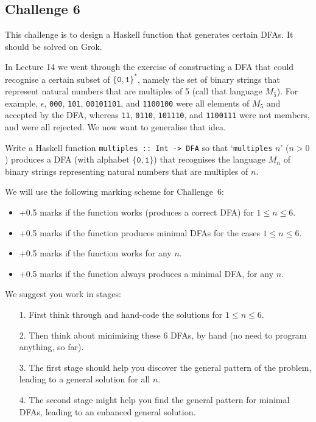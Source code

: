 \documentclass[12pt]{article}
\begin{document}
\subsection*{Challenge 6}

This challenge is to design a Haskell function that generates 
certain DFAs.
It should be solved on Grok.

In Lecture 14 we went through the exercise of constructing a DFA
that could recognise a certain subset of $\{\texttt{0},\texttt{1}\}^*$, 
namely the set of binary strings that represent natural numbers that 
are multiples of 5 (call that language $M_5$).
For example, $\epsilon$, \verb!000!, \verb!101!, \verb!00101101!, 
and \verb!1100100! were all elements of $M_5$ and accepted by the DFA, 
whereas \verb!11!, \verb!0110!, \verb!101110!, and \verb!1100111! 
were not members, and were all rejected.
We now want to generalise that idea.

Write a Haskell function \verb!multiples :: Int -> DFA! so that
`\verb!multiples! $n$' ($n>0$) produces a DFA 
(with alphabet $\{\texttt{0},\texttt{1}\}$) 
that recognises the language $M_n$ of binary strings 
representing natural numbers that are multiples of $n$.

We will use the following marking scheme for Challenge~6:
\begin{itemize}
\addtolength{\itemsep}{-6pt}
\item
+0.5 marks if the function works (produces a correct DFA) 
for $1 \leq n \leq 6$.
\item
+0.5 marks if the function produces minimal DFAs for the cases
$1 \leq n \leq 6$.
\item
+0.5 marks if the function works for any $n$.
\item
+0.5 marks if the function always produces a minimal DFA,
for any $n$.
\end{itemize}
We suggest you work in stages:
\begin{enumerate}
\addtolength{\itemsep}{-6pt}
\item[1.]
First think through and hand-code the solutions for $1 \leq n \leq 6$.
\item[2.]
Then think about minimising these 6 DFAs, by hand 
(no need to program anything, so far).
\item[3.]
The first stage should help you discover the general pattern 
of the problem, leading to a general solution for all $n$.
\item[4.]
The second stage might help you find the general pattern 
for minimal DFAs, leading to an enhanced general solution.
\end{enumerate}
\end{document}
